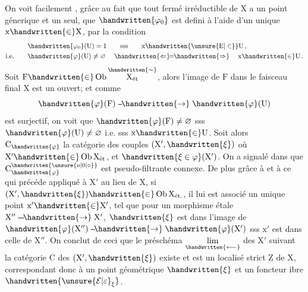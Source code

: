 \begin{lrbox}{\coteFourTypescript}
\begin{minipage}[t]{.96\linewidth}
On voit facilement , grâce au fait que tout fermé irréductible de $\mathrm X$ a un point génerique et un seul, que $\handwritten{\varphi_{0}}$ est defini à l'aide d'un  unique $\mathrm x\handwritten{\in}\mathrm X$, par la condition
\[
\begin{aligned}
&\handwritten{\varphi_{0}}(\mathrm U)=1\qquad\text{sss}\qquad \mathrm x\handwritten{\unsure{\mathrm E|\in}}\mathrm U\,,\\
\text{i.e.}\qquad &\handwritten{\varphi}(\mathrm U)\ne\varnothing\quad \mathrel{\handwritten{\Leftarrow}\mkern-7mu=\mkern-7mu\handwritten{\Rightarrow}}\quad \mathrm x\handwritten{\in}\mathrm U\,.
\end{aligned}
\]
Soit $\mathrm F\handwritten{\in}\operatorname{Ob}\overset{\handwritten{\sim}}{\mathrm X_{\text{ét}}}$, alors l'image de $\mathrm F$ dans le faisceau final $\mathrm X$ est un ouvert; et comme
\[
\handwritten{\varphi}(\mathrm F)\mathrel{\mbox{-}\mkern-2mu\mbox{-}\mkern-3mu\handwritten{\to}}\handwritten{\varphi}(\mathrm U)
\]
est surjectif, on voit que $\handwritten{\varphi}(\mathrm F)\ne\varnothing$ sss $\handwritten{\varphi}(\mathrm U)\ne\varnothing$ i.e. sss $\mathrm x\handwritten{\in}\mathrm U$. Soit alors $\mathrm C_{\handwritten{\varphi}}$ la catégorie des couples $(\mathrm X',\handwritten{\xi})$ où $\mathrm X'\handwritten{\in}\operatorname{Ob}\mathrm X_{\text{ét}}$, et $\handwritten{\xi\in\varphi}(\mathrm X')$. On a signalé dans  que $\mathrm C_{\handwritten{\varphi}}^{\handwritten{\unsure{o|0|\circ}}}$ est pseudo-filtrante connexe. De plus grâce à  et à ce qui précéde appliqué à $\mathrm X'$ au lieu de $\mathrm X$, si $(\mathrm X',\handwritten{\xi})\handwritten{\in}\operatorname{Ob}\mathrm X_{\text{ét.}}$, il lui est\unsure{:} associé un unique point $\mathrm x'\handwritten{\in}\mathrm X'$, tel que pour un morphisme étale $\mathrm X''\mathrel{\mbox{-}\mkern-2mu\mbox{-}\mkern-2mu\mbox{-}\mkern-3mu\handwritten{\to}}\mathrm X'$, $\handwritten{\xi}$ est dans l'image de $\handwritten{\varphi}(\mathrm X'')\mathrel{\mbox{-}\mkern-2mu\mbox{-}\mkern-3mu\handwritten{\to}}\handwritten{\varphi}(\mathrm X')$ sss $\mathrm x'$ est dans celle de $\mathrm X''$. On conclut de ceci que le préschéma $\underset{\handwritten{\longleftarrow}}{\lim}$ des $\mathrm X'$ suivant la catégorie $\mathrm C$ des $(\mathrm X',\handwritten{\xi})$ existe et est un localisé strict $\mathrm Z$ de $\mathrm X$, correspondant donc à un point géométrique $\handwritten{\xi}$ et un foncteur ibre $\handwritten{{\unsure{\mathcal E|\varepsilon}}_{\xi}}$.
\end{minipage}
\end{lrbox}
